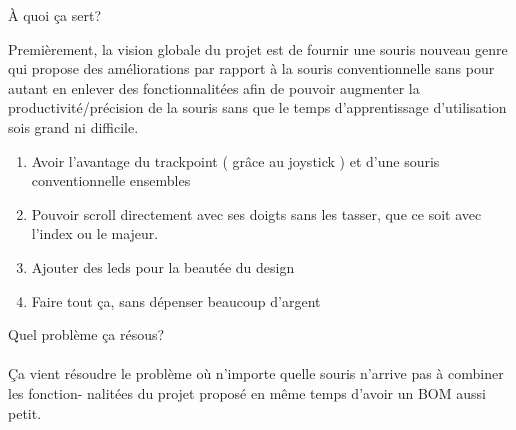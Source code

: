 À quoi ça sert?

Premièrement, la vision globale du projet est de fournir une souris nouveau genre qui
propose des améliorations par rapport à la souris conventionnelle sans pour autant en
enlever des fonctionnalitées afin de pouvoir augmenter la productivité/précision de la
souris sans que le temps d'apprentissage d'utilisation sois grand ni difficile.

\begin{enumerate}
\item Avoir l'avantage du trackpoint ( grâce au joystick ) et d'une souris conventionnelle ensembles
\item Pouvoir scroll directement avec ses doigts sans les tasser, que ce soit avec l'index
    ou le majeur.
\item Ajouter des leds pour la beautée du design
\item Faire tout ça, sans dépenser beaucoup d'argent
\end{enumerate}

Quel problème ça résous?
\\
\\
Ça vient résoudre le problème où n'importe quelle souris n'arrive pas à combiner les fonction-
nalitées du projet proposé en même temps d'avoir un BOM aussi petit.
